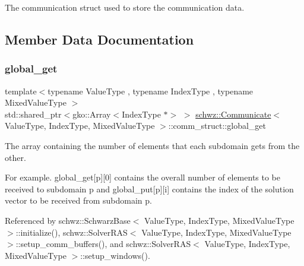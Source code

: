The communication struct used to store the communication data. 

\subsection{Member Data Documentation}
\mbox{\label{structschwz_1_1Communicate_1_1comm__struct_a4166e2bb75eeaf48ee39ca7cdc3adb01}} 
\subsubsection{\texorpdfstring{global\+\_\+get}{global\_get}}
{\footnotesize\ttfamily template$<$typename Value\+Type , typename Index\+Type , typename Mixed\+Value\+Type $>$ \\
std\+::shared\+\_\+ptr$<$gko\+::\+Array$<$Index\+Type $\ast$$>$ $>$ \hyperlink{classschwz_1_1Communicate}{schwz\+::\+Communicate}$<$ Value\+Type, Index\+Type, Mixed\+Value\+Type $>$\+::comm\+\_\+struct\+::global\+\_\+get}



The array containing the number of elements that each subdomain gets from the other. 

For example. global\+\_\+get\mbox{[}p\mbox{]}\mbox{[}0\mbox{]} contains the overall number of elements to be received to subdomain p and global\+\_\+put\mbox{[}p\mbox{]}\mbox{[}i\mbox{]} contains the index of the solution vector to be received from subdomain p. 

Referenced by schwz\+::\+Schwarz\+Base$<$ Value\+Type, Index\+Type, Mixed\+Value\+Type $>$\+::initialize(), schwz\+::\+Solver\+R\+A\+S$<$ Value\+Type, Index\+Type, Mixed\+Value\+Type $>$\+::setup\+\_\+comm\+\_\+buffers(), and schwz\+::\+Solver\+R\+A\+S$<$ Value\+Type, Index\+Type, Mixed\+Value\+Type $>$\+::setup\+\_\+windows().

\mbox{\label{structschwz_1_1Communicate_1_1comm__struct_a9186bd26e5826aa6ad88c863798593ac}} 

